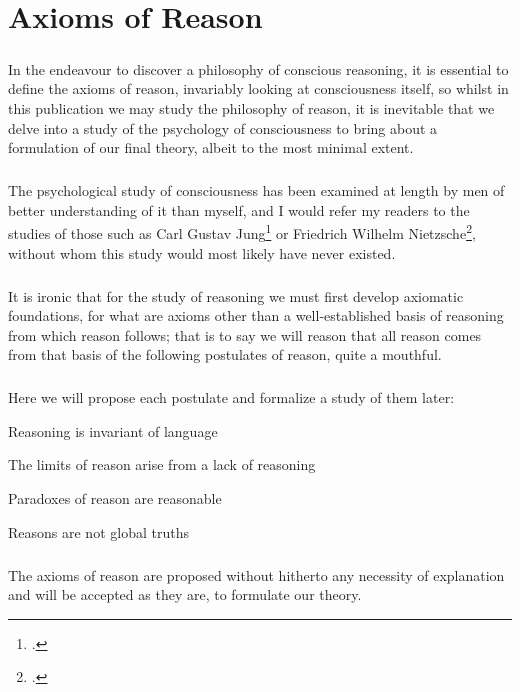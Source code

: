 \chapter{Axioms of Reason}\label{chapter:axiomsofreason}

\paragraph{}In the endeavour to discover a philosophy of conscious reasoning, it is essential to define the axioms of reason, invariably looking at consciousness itself, so whilst in this publication we may study the philosophy of reason, it is inevitable that we delve into a study of the psychology of consciousness to bring about a formulation of our final theory, albeit to the most minimal extent.

\paragraph{}The psychological study of consciousness has been examined at length by men of better understanding of it than myself, and I would refer my readers to the studies of those such as Carl Gustav Jung\footcite{jung2017modern} or Friedrich Wilhelm Nietzsche\footcite{nietzsche2014beyond}, without whom this study would most likely have never existed.

\paragraph{}It is ironic that for the study of reasoning we must first develop axiomatic foundations, for what are axioms other than a well-established basis of reasoning from which reason follows; that is to say we will reason that all reason comes from that basis of the following postulates of reason, quite a mouthful.

\paragraph{}Here we will propose each postulate and formalize a study of them later:

\begin{postulate}
    Reasoning is invariant of language
\end{postulate}

\begin{postulate}
    The limits of reason arise from a lack of reasoning
\end{postulate}

\begin{postulate}
    Paradoxes of reason are reasonable
\end{postulate}

\begin{postulate}
    Reasons are not global truths
\end{postulate}

\paragraph{}The axioms of reason are proposed without hitherto any necessity of explanation and will be accepted as they are, to formulate our theory.